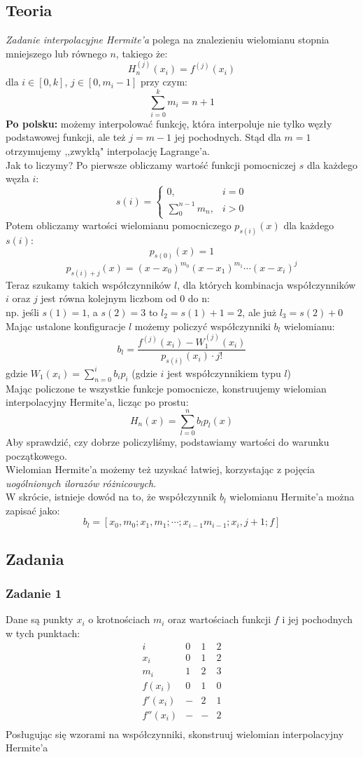 \documentclass[a4paper]{article}
\begin{document}
\subsection{Teoria}
\emph{Zadanie interpolacyjne Hermite'a} polega na znalezieniu wielomianu stopnia mniejszego lub równego $n$, takiego że:
$$H_n^{(j)}(x_i) = f^{(j)}(x_i)$$
dla $i \in [0,k]$, $j \in [0, m_i - 1]$
przy czym:
$$\sum_{i=0}^km_i = n+1$$
\textbf{Po polsku: } możemy interpolować funkcję, która interpoluje nie tylko węzły podstawowej funkcji, ale też $j = m-1$ jej pochodnych. Stąd dla $m=1$ otrzymujemy ,,zwykłą" interpolację Lagrange'a.\\
Jak to liczymy? Po pierwsze obliczamy wartość funkcji pomocniczej $s$ dla każdego węzła $i$:
$$s(i) = \begin{cases}0,& i=0\\\sum_0^{n-1}m_n, & i>0 \end{cases}$$
Potem obliczamy wartości wielomianu pomocniczego $p_{s(i)}(x)$ dla każdego $s(i):$\\
$$p_{s(0)}(x) = 1$$
$$p_{s(i)+j}(x) = (x-x_0)^{m_0}(x-x_1)^{m_1}\cdots (x-x_i)^j$$
Teraz szukamy takich współczynników $l$, dla których kombinacja współczynników $i$ oraz $j$ jest równa kolejnym liczbom od 0 do n:\\
np. jeśli $s(1) = 1$, a $s(2) = 3$ to $l_2 = s(1) + 1 = 2$, ale już $l_3 = s(2) + 0$\\
Mając ustalone konfiguracje $l$ możemy policzyć współczynniki $b_l$ wielomianu:
$$b_l = \frac{f^{(j)}(x_i) - W_1^{(j)}(x_i)}{p_{s(i)}(x_i)\cdot j!}$$
gdzie $W_1(x_i) = \sum_{n=0}^ib_ip_i$ (gdzie $i$ jest współczynnikiem typu $l$)\\
Mając policzone te wszystkie funkcje pomocnicze, konstruujemy wielomian interpolacyjny Hermite'a, licząc po prostu:
$$H_n(x) = \sum_{l=0}^n b_lp_l(x)$$
Aby sprawdzić, czy dobrze policzyliśmy, podstawiamy wartości do warunku początkowego.\\
Wielomian Hermite'a możemy też uzyskać łatwiej, korzystając z pojęcia \emph{uogólnionych ilorazów różnicowych}.\\
W skrócie, istnieje dowód na to, że współczynnik $b_l$ wielomianu Hermite'a można zapisać jako:
$$b_l = [x_0,m_0;x_1,m_1;\cdots;x_{i-1}m_{i-1};x_i, j+1; f]$$
\subsection{Zadania}
\subsubsection*{Zadanie 1}
Dane są punkty $x_i$ o krotnościach $m_i$ oraz wartościach funkcji $f$ i jej pochodnych w tych punktach:
$$\begin{array}{c|ccc}
i&0&1&2\\
\hline
x_i&0&1&2\\
m_i&1&2&3\\
f(x_i)&0&1&0\\
f'(x_i)&-&2&1\\
f''(x_i)&-&-&2\\
\end{array}$$
Posługując się wzorami na współczynniki, skonstruuj wielomian interpolacyjny Hermite'a
\end{document}
